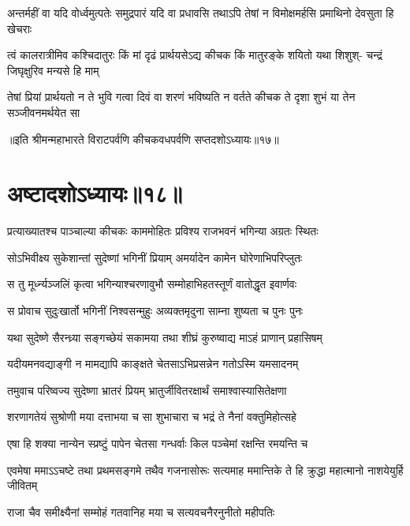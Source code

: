\fourlineindentedshloka
{अन्तर्महीं वा यदि वोर्ध्वमुत्पतेः}
{समुद्रपारं यदि वा प्रधावसि}
{तथाऽपि तेषां न विमोक्षमर्हसि}
{प्रमाथिनो देवसुता हि खेचराः}


\fourlineindentedshloka
{त्वं कालरात्रीमिव कश्चिदातुरः}
{किं मां दृढं प्रार्थयसेऽद्य कीचक}
{किं मातुरङ्के शयितो यथा शिशुश्-}
{चन्द्रं जिघृक्षुरिव मन्यसे हि माम्}


\fourlineindentedshloka
{तेषां प्रियां प्रार्थयतो न ते भुवि}
{गत्वा दिवं वा शरणं भविष्यति}
{न वर्तते कीचक ते दृशा शुभं}
{या तेन सञ्जीवनमर्थयेत सा}

॥इति श्रीमन्महाभारते विराटपर्वणि कीचकवधपर्वणि सप्तदशोऽध्यायः॥१७॥

\chapter{अष्टादशोऽध्यायः॥१८॥}

\twolineshloka
{प्रत्याख्यातश्च पाञ्चाल्या कीचकः काममोहितः}
{प्रविश्य राजभवनं भगिन्या अग्रतः स्थितः}


\twolineshloka
{सोऽभिवीक्ष्य सुकेशान्तां सुदेष्णां भगिनीं प्रियाम्}
{अमर्यादेन कामेन घोरेणाभिपरिप्लुतः}


\twolineshloka
{स तु मूर्ध्न्यञ्जलिं कृत्वा भगिन्याश्चरणावुभौ}
{सम्मोहाभिहतस्तूर्णं वातोद्धृत इवार्णवः}


\twolineshloka
{स प्रोवाच सुदुःखार्तो भगिनीं निश्वसन्मुहुः}
{अव्यक्तमृदुना साम्ना शुष्यता च पुनः पुनः}


\twolineshloka
{यथा सुदेष्णे सैरन्ध्र्या सङ्गच्छेयं सकामया}
{तथा शीघ्रं कुरुष्वाद्य माऽहं प्राणान् प्रहासिषम्}


\twolineshloka
{यदीयमनवद्याङ्गी न मामद्यापि काङ्क्षते}
{चेतसाऽभिप्रसन्नेन गतोऽस्मि यमसादनम्}



\twolineshloka
{तमुवाच परिष्वज्य सुदेष्णा भ्रातरं प्रियम्}
{भ्रातुर्जीवितरक्षार्थं समाश्वास्यासितेक्षणा}


\twolineshloka
{शरणागतेयं सुश्रोणी मया दत्ताभया च सा}
{शुभाचारा च भद्रं ते नैनां वक्तुमिहोत्सहे}


\twolineshloka
{एषा हि शक्या नान्येन स्प्रष्टुं पापेन चेतसा}
{गन्धर्वाः किल पञ्चेमां रक्षन्ति रमयन्ति च}


\threelineshloka
{एवमेषा ममाऽऽचष्टे तथा प्रथमसङ्गमे}
{तथैव गजनासोरूः सत्यमाह ममान्तिके}
{ते हि क्रुद्धा महात्मानो नाशयेयुर्हि जीवितम्}


\twolineshloka
{राजा चैव समीक्ष्यैनां सम्मोहं गतवानिह}
{मया च सत्यवचनैरनुनीतो महीपतिः}



